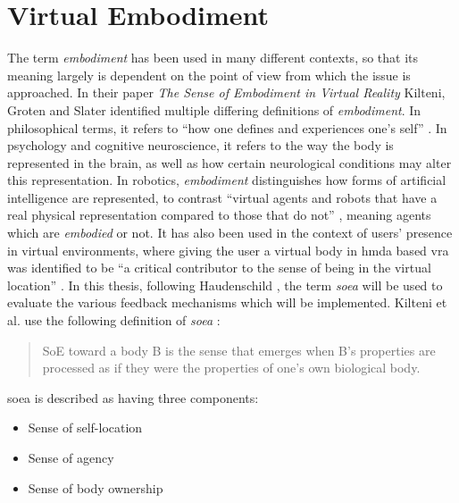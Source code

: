 
\chapter{Virtual Embodiment}\label{chapter:VirtualEmbodiment}

The term \textit{embodiment} has been used in many different contexts, so that its meaning largely is dependent on the point of view from which the issue is approached.
\newline
In their paper \textit{The Sense of Embodiment in Virtual Reality} \autocite{senseEmbodimentVR} Kilteni, Groten and Slater identified multiple differing definitions of \textit{embodiment}.
In philosophical terms, it refers to \enquote{how one defines and experiences one’s self} \autocite[p. ~2]{senseEmbodimentVR}. In psychology and cognitive neuroscience, it refers to the way the body is represented in the brain, as well as how certain neurological conditions may alter this representation. In robotics, \textit{embodiment} distinguishes how forms of artificial intelligence are represented, to contrast \enquote{virtual agents and robots that have a real physical representation compared to those that do not} \autocite[p. ~2]{senseEmbodimentVR}, meaning agents which are \textit{embodied} or not. It has also been used in the context of users' presence in virtual environments, where giving the user a virtual body in \gls{hmda} based \gls{vra} was identified to be \enquote{a critical contributor to the
sense of being in the virtual location} \autocite[p. ~2]{senseEmbodimentVR}.
\newline
In this thesis, following Haudenschild \autocite{JohnnyVEThesis}, the term \textit{\gls{soea}} will be used to evaluate the various feedback mechanisms which will be implemented. Kilteni et al. use the following definition of \textit{\gls{soea}} \autocite[p. ~2-3]{senseEmbodimentVR}:
\begin{quote}
    SoE toward a body B is the sense that emerges when B’s properties are processed as if they were the properties of one’s own biological body.
\end{quote}
\Gls{soea} is described as having three components:
\begin{itemize}
    \item Sense of self-location
    \item Sense of agency
    \item Sense of body ownership
\end{itemize}


